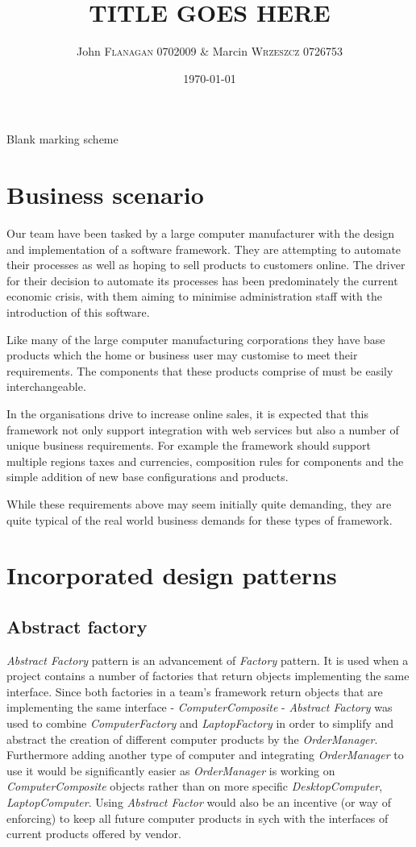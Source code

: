 \documentclass[pdftex,11pt,a4paper]{article}
\author{John \textsc{Flanagan} 0702009 \& Marcin \textsc{Wrzeszcz} 0726753 }
\title{TITLE GOES HERE}
\date{\today}
\begin{document}


\begin{center}
	Blank marking scheme
\end{center}

\pagebreak

\tableofcontents
\pagebreak

\section{Business scenario}
Our team have been tasked by a large computer manufacturer with the design and implementation of a software framework. They are attempting to automate their processes as well as hoping to sell products to customers online. The driver for their decision to automate  its processes has been predominately the current economic crisis, with them aiming to minimise administration staff with the introduction of this software. 

Like many of the large computer manufacturing corporations they have base products which the home or business user may customise to meet their requirements. The components that these products comprise of must be easily interchangeable. 

In the organisations drive to increase online sales, it is expected that this framework not only support integration with web services but also a number of unique business requirements. For example the framework should support multiple regions taxes and currencies, composition rules for components and the simple addition of new base configurations and products.

While these requirements above may seem initially quite demanding, they are quite typical of the real world business demands for these types of framework.

\pagebreak
\section{Incorporated design patterns}

\subsection{Abstract factory}
\emph{Abstract Factory} pattern is an advancement of \emph{Factory} pattern. It is used when a project contains a number of factories that return objects implementing the same interface. Since both factories in a team's framework return objects that are implementing the same interface - \emph{ComputerComposite} - \emph{Abstract Factory} was used to combine \emph{ComputerFactory} and \emph{LaptopFactory} in order to simplify and abstract the creation of different computer products by the \emph{OrderManager}. Furthermore adding another type of computer and integrating \emph{OrderManager} to use it would be significantly easier as \emph{OrderManager} is working on \emph{ComputerComposite} objects rather than on more specific \emph{DesktopComputer}, \emph{LaptopComputer}. 
Using \emph{Abstract Factor} would also be an incentive (or way of enforcing) to keep all future computer products in sych with the interfaces of current products offered by vendor.
\end{document}
